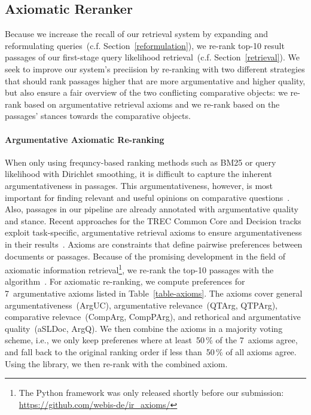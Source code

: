 \subsection{Axiomatic Reranker}
\label{reranking}


Because we increase the recall of our retrieval system by expanding and reformulating queries~(c.f. Section~\ref{reformulation}), we re-rank top-10 result passages of our first-stage query likelihood retrieval~(c.f. Section~\ref{retrieval}).
We seek to improve our system's preciision by re-ranking with two different strategies that should rank passages higher that are more argumentative and higher quality, but also ensure a fair overview of the two conflicting comparative objects: \Ni we re-rank based on argumentative retrieval axioms and \Nii we re-rank based on the passages' stances towards the comparative objects.

\paragraph{Argumentative Axiomatic Re-ranking}

When only using frequncy-based ranking methods such as BM25 or query likelihood with Dirichlet smoothing, it is difficult to capture the inherent argumentativeness in passages.
This argumentativeness, however, is most important for finding relevant and useful opinions on comparative questions~\cite{BondarenkoFKSGBPBSWPH2022}.
Also, passages in our pipeline are already annotated with argumentative quality and stance.
Recent approaches for the TREC Common Core and Decision tracks exploit task-specific, argumentative retrieval axioms to ensure argumentativeness in their results~\cite{BondarenkoHVSPB2018,BondarenkoFKHVS2019}.
Axioms are constraints that define pairwise preferences between documents or passages.
Because of the promising development in the field of axiomatic information retrieval\footnote{The \iraxioms Python framework was only released shortly before our submission: \url{https://github.com/webis-de/ir_axioms/}}, we re-rank the top-10 passages with the \KwikSort algorithm~\cite{HagenVGS2016}.
For axiomatic re-ranking, we compute preferences for 7~argumentative axioms listed in Table~\ref{table-axioms}.
The axioms cover general argumentativeness~(ArgUC), argumentative relevance~(QTArg, QTPArg), comparative relevace~(CompArg, CompPArg), and rethorical and argumentative quality~(aSLDoc, ArgQ).
We then combine the axioms in a majority voting scheme, i.e., we only keep preferenes where at least~50\,\% of the 7~axioms agree, and fall back to the original ranking order if less than~50\,\% of all axioms agree.
Using the \iraxioms library, we then re-rank with the combined axiom.

